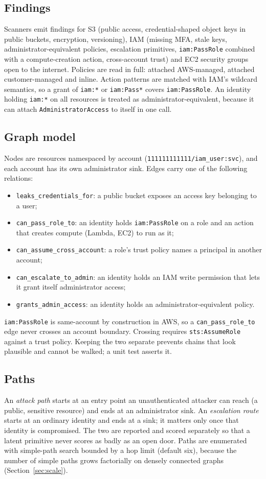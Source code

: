 \documentclass[conference]{IEEEtran}
\begin{document}
\subsection{Findings}
Scanners emit findings for S3 (public access, credential-shaped object keys in public buckets, encryption, versioning), IAM (missing MFA, stale keys, administrator-equivalent policies, escalation primitives, \texttt{iam:PassRole} combined with a compute-creation action, cross-account trust) and EC2 security groups open to the internet. Policies are read in full: attached AWS-managed, attached customer-managed and inline. Action patterns are matched with IAM's wildcard semantics, so a grant of \texttt{iam:*} or \texttt{iam:Pass*} covers \texttt{iam:PassRole}. An identity holding \texttt{iam:*} on all resources is treated as administrator-equivalent, because it can attach \texttt{AdministratorAccess} to itself in one call.

\subsection{Graph model}
Nodes are resources namespaced by account (\texttt{111111111111/iam\_user:svc}), and each account has its own administrator sink. Edges carry one of the following relations:
\begin{itemize}
\item \texttt{leaks\_credentials\_for}: a public bucket exposes an access key belonging to a user;
\item \texttt{can\_pass\_role\_to}: an identity holds \texttt{iam:PassRole} on a role and an action that creates compute (Lambda, EC2) to run as it;
\item \texttt{can\_assume\_cross\_account}: a role's trust policy names a principal in another account;
\item \texttt{can\_escalate\_to\_admin}: an identity holds an IAM write permission that lets it grant itself administrator access;
\item \texttt{grants\_admin\_access}: an identity holds an administrator-equivalent policy.
\end{itemize}
\texttt{iam:PassRole} is same-account by construction in AWS, so a \texttt{can\_pass\_role\_to} edge never crosses an account boundary. Crossing requires \texttt{sts:AssumeRole} against a trust policy. Keeping the two separate prevents chains that look plausible and cannot be walked; a unit test asserts it.

\subsection{Paths}
An \textit{attack path} starts at an entry point an unauthenticated attacker can reach (a public, sensitive resource) and ends at an administrator sink. An \textit{escalation route} starts at an ordinary identity and ends at a sink; it matters only once that identity is compromised. The two are reported and scored separately so that a latent primitive never scores as badly as an open door. Paths are enumerated with simple-path search bounded by a hop limit (default six), because the number of simple paths grows factorially on densely connected graphs (Section~\ref{sec:scale}).
\end{document}
